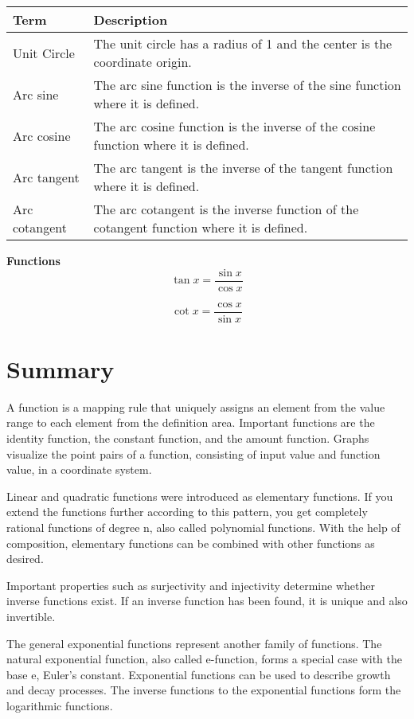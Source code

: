 \documentclass{book}
\begin{document}
\begin{tabular}{p{3cm}p{10.5cm}}
  \toprule
  \textbf{Term} & \textbf{Description} \\
  \midrule
  Unit Circle & The unit circle has a radius of 1 and the center is the coordinate origin.\\
  \midrule
  Arc sine & The arc sine function is the inverse of the sine function where it is defined.\\
  \midrule
  Arc cosine & The arc cosine function is the inverse of the cosine function where it is defined.\\
  \midrule
  Arc tangent & The arc tangent is the inverse of the tangent function where it is defined.\\
  \midrule
  Arc cotangent & The arc cotangent is the inverse function of the cotangent function where it is defined.\\
  \bottomrule
\end{tabular}

\textbf{Functions}
\[
  \tan x = \frac{\sin x}{\cos x}
\]

\[
  \cot x = \frac{\cos x}{\sin x}
\]

\section{Summary}
A function is a mapping rule that uniquely assigns an element from the value range to each element from the definition area. Important functions are the identity function, the constant function, and the amount function. Graphs visualize the point pairs of a function, consisting of input value and function value, in a coordinate system.

Linear and quadratic functions were introduced as elementary functions. If you extend the functions further according to this pattern, you get completely rational functions of degree n, also called polynomial functions. With the help of composition, elementary functions can be combined with other functions as desired.

Important properties such as surjectivity and injectivity determine whether inverse functions exist. If an inverse function has been found, it is unique and also invertible.

The general exponential functions represent another family of functions. The natural exponential function, also called e-function, forms a special case with the base e, Euler’s constant. Exponential functions can be used to describe growth and decay processes. The inverse functions to the exponential functions form the logarithmic functions.
\end{document}
